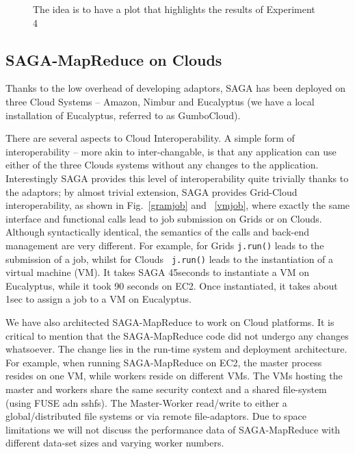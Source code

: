 \documentclass[conference,final]{IEEEtran}
\newcommand{\sagamapreduce }{SAGA-MapReduce }
\begin{document}
\begin{figure}[t]
      \centering
          \caption{The idea is to have a plot that highlights the results of Experiment 4}
      \label{saga_mapreduce_3workers.png}
\end{figure}

\subsection{SAGA-MapReduce on Clouds}

Thanks to the low overhead of developing adaptors, SAGA has been deployed
on  three Cloud Systems -- Amazon, Nimbur and Eucalyptus (we have a local
installation of Eucalyptus, referred to as GumboCloud).

There are several aspects to Cloud Interoperability. A simple form of
interoperability -- more akin to inter-changable, is that any
application can use either of the three Clouds systems without any
changes to the application.  Interestingly SAGA provides this level of
interoperability quite trivially thanks to the adaptors; by almost
trivial extension, SAGA provides Grid-Cloud interoperability, as shown
in Fig.~\ref{gramjob} and ~\ref{vmjob}, where exactly the same
interface and functional calls lead to job submission on Grids or on
Clouds. Although syntactically identical, the semantics of the calls
and back-end management are very different.  For example, for Grids
{\tt j.run()} leads to the submission of a job, whilst for Clouds {\tt
  j.run()} leads to the instantiation of a virtual machine (VM).  It
takes SAGA 45seconds to instantiate a VM on Eucalyptus, while it took
90 seconds on EC2. Once instantiated, it takes about 1sec to assign a
job to a VM on Eucalyptus.

We have also architected \sagamapreduce to work on Cloud platforms. It
is critical to mention that the \sagamapreduce code did not undergo
any changes whatsoever. The change lies in the run-time system and
deployment architecture. For example, when running \sagamapreduce on
EC2, the master process resides on one VM, while workers reside on
different VMs. The VMs hosting the master and workers share the same
security context and a shared file-system (using FUSE adn sshfs). The
Master-Worker read/write to either a global/distributed file systems
or via remote file-adaptors.  Due to space limitations we will not
discuss the performance data of \sagamapreduce with different data-set
sizes and varying worker numbers.
\end{document}

